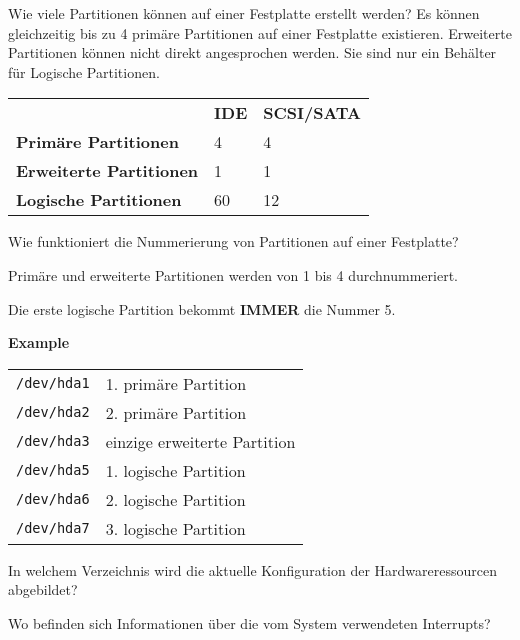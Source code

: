 \begin{flashcard}[Information]{Wie viele Partitionen können auf einer Festplatte erstellt werden?}
	Es können gleichzeitig bis zu 4 primäre Partitionen auf einer Festplatte existieren. Erweiterte Partitionen können nicht direkt angesprochen werden. Sie sind nur ein Behälter für Logische Partitionen.
	\begin{tabular}{lll}
		& \textbf{IDE} & \textbf{SCSI/SATA}\\
		\textbf{Primäre Partitionen}	& 4 	& 4 \\
		\textbf{Erweiterte Partitionen} & 1		& 1 \\
		\textbf{Logische Partitionen} & 60 & 12\\
	\end{tabular}
\end{flashcard}

\begin{flashcard}[Information]{Wie funktioniert die Nummerierung von Partitionen auf einer Festplatte?}
	
	\begin{description}
	\item Primäre und erweiterte Partitionen werden von 1 bis 4 durchnummeriert. 
	\item Die erste logische Partition bekommt \textbf{IMMER} die Nummer 5.
	\end{description}

	
	\textbf{Example}
	
	\begin{tabular}{ll}
		\texttt{/dev/hda1} & 1. primäre Partition\\
		\texttt{/dev/hda2} & 2. primäre Partition\\
		\texttt{/dev/hda3} & einzige erweiterte Partition\\
		\texttt{/dev/hda5} & 1. logische Partition\\
		\texttt{/dev/hda6} & 2. logische Partition\\
		\texttt{/dev/hda7} & 3. logische Partition\\
	\end{tabular}
\end{flashcard}

\begin{flashcard}[Folder]{In welchem Verzeichnis wird die aktuelle Konfiguration der Hardwareressourcen abgebildet?}
	
\end{flashcard}

\begin{flashcard}[Folder]{Wo befinden sich Informationen über die vom System verwendeten Interrupts?}
	
\end{flashcard}

